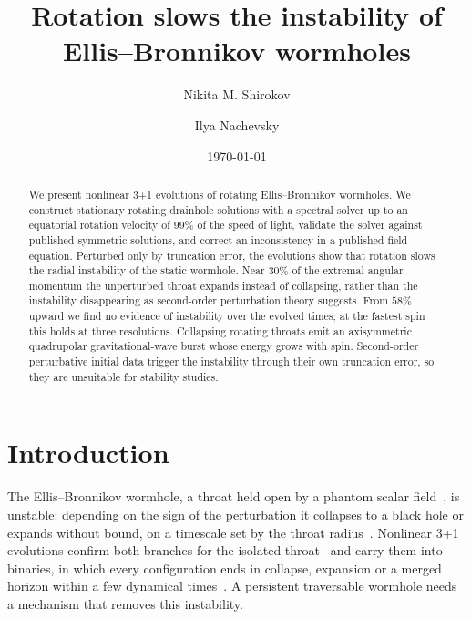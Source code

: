 \documentclass[twocolumn,floatfix,aps,prd,superscriptaddress,nofootinbib]{revtex4-2}
\begin{document}
\raggedbottom

\title{Rotation slows the instability of Ellis--Bronnikov wormholes}

\author{Nikita M. Shirokov}
\author{Ilya Nachevsky}
\date{\today}

\begin{abstract}
We present nonlinear 3+1 evolutions of rotating Ellis--Bronnikov wormholes. We construct stationary rotating drainhole solutions with a spectral solver up to an equatorial rotation velocity of $99\%$ of the speed of light, validate the solver against published symmetric solutions, and correct an inconsistency in a published field equation. Perturbed only by truncation error, the evolutions show that rotation slows the radial instability of the static wormhole. Near $30\%$ of the extremal angular momentum the unperturbed throat expands instead of collapsing, rather than the instability disappearing as second-order perturbation theory suggests. From $58\%$ upward we find no evidence of instability over the evolved times; at the fastest spin this holds at three resolutions. Collapsing rotating throats emit an axisymmetric quadrupolar gravitational-wave burst whose energy grows with spin. Second-order perturbative initial data trigger the instability through their own truncation error, so they are unsuitable for stability studies.
\end{abstract}

\maketitle

\section{Introduction}
\label{sec:intro}

The Ellis--Bronnikov wormhole, a throat held open by a phantom scalar field~\cite{ellis1973,bronnikov1973,morris_thorne1988,visser1995}, is unstable: depending on the sign of the perturbation it collapses to a black hole or expands without bound, on a timescale set by the throat radius~\cite{gonzalez2009lin,gonzalez2009,shinkai2002,bronnikov2011,cremona2019}. Nonlinear 3+1 evolutions confirm both branches for the isolated throat~\cite{shirokov2026} and carry them into binaries, in which every configuration ends in collapse, expansion or a merged horizon within a few dynamical times~\cite{shirokov2026c}. A persistent traversable wormhole needs a mechanism that removes this instability.
\end{document}
